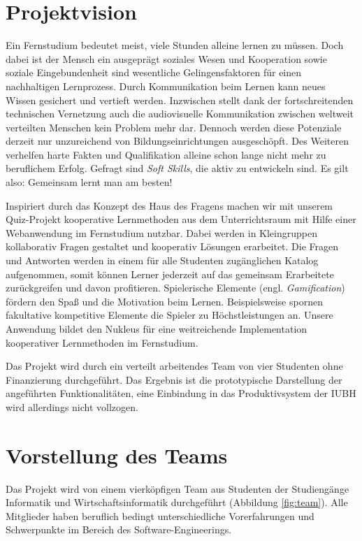 \documentclass[a4paper,11pt,listof=numbered,glossary=totoc,parskip=half]{scrreprt}
\begin{document}
	
	\newpage
	\setcounter{tocdepth}{1}
	\tableofcontents
	\newpage


	\chapter{Projektvision}
	
	Ein Fernstudium bedeutet meist, viele Stunden alleine lernen zu müssen. Doch dabei ist der Mensch ein ausgeprägt soziales Wesen und Kooperation sowie soziale Eingebundenheit sind wesentliche Gelingensfaktoren für einen nachhaltigen Lernprozess. Durch Kommunikation beim Lernen kann neues Wissen gesichert und vertieft werden. Inzwischen stellt dank der fortschreitenden technischen Vernetzung auch die audiovisuelle Kommunikation zwischen weltweit verteilten Menschen kein Problem mehr dar. Dennoch werden diese Potenziale derzeit nur unzureichend von Bildungseinrichtungen ausgeschöpft.
Des Weiteren verhelfen harte Fakten und Qualifikation alleine schon lange nicht mehr zu beruflichem Erfolg. Gefragt sind \textit{Soft Skills}, die aktiv zu entwickeln sind. Es gilt also: Gemeinsam lernt man am besten!

Inspiriert durch das Konzept des \frqq{}Haus des Fragens\flqq{} \autocite{HausDesFragens} machen wir mit unserem Quiz-Projekt kooperative Lernmethoden aus dem Unterrichtsraum mit Hilfe einer Webanwendung im Fernstudium nutzbar. Dabei werden in Kleingruppen kollaborativ Fragen gestaltet und kooperativ Lösungen erarbeitet. Die Fragen und Antworten werden in einem für alle Studenten zugänglichen Katalog aufgenommen, somit können Lerner jederzeit auf das gemeinsam Erarbeitete zurückgreifen und davon profitieren. Spielerische Elemente (engl. \textit{Gamification}) fördern den Spaß und die Motivation beim Lernen. Beispielsweise spornen fakultative kompetitive Elemente die Spieler zu Höchstleistungen an. Unsere Anwendung bildet den Nukleus für eine weitreichende Implementation kooperativer Lernmethoden im Fernstudium.

Das Projekt wird durch ein verteilt arbeitendes Team von vier Studenten ohne Finanzierung durchgeführt. Das Ergebnis ist die prototypische Darstellung der angeführten Funktionalitäten, eine Einbindung in das Produktivsystem der IUBH wird allerdings nicht vollzogen.
\newpage
	\chapter{Vorstellung des Teams}
	Das Projekt wird von einem vierköpfigen Team aus Studenten der Studiengänge Informatik und Wirtschaftsinformatik durchgeführt (Abbildung \ref{fig:team}). Alle Mitglieder haben beruflich bedingt unterschiedliche Vorerfahrungen und Schwerpunkte im Bereich des Software-Engineerings.
\end{document}
